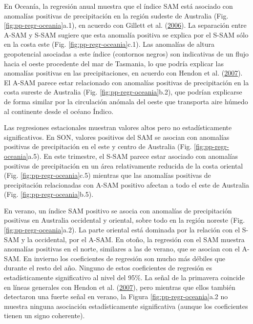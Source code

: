 \documentclass[12pt,oneside,a4paper]{reedthesis}
\begin{document}
En Oceanía, la regresión anual muestra que el índice SAM está asociado con anomalías positivas de precipitación en la región sudeste de Australia (Fig. \ref{fig:pp-regr-oceania}a.1), en acuerdo con Gillett et al. (\protect\hyperlink{ref-gillett2006}{2006}).
La separación entre A-SAM y S-SAM sugiere que esta anomalía positiva se explica por el S-SAM sólo en la costa este (Fig. \ref{fig:pp-regr-oceania}c.1).
Las anomalías de altura geopotencial asociadas a este índice (contornos negros) son indicativas de un flujo hacia el oeste procedente del mar de Tasmania, lo que podría explicar las anomalías positivas en las precipitaciones, en acuerdo con Hendon et al. (\protect\hyperlink{ref-hendon2007}{2007}).
El A-SAM parece estar relacionado con anomalías positivas de precipitación en la costa sureste de Australia (Fig. \ref{fig:pp-regr-oceania}b.2), que podrían explicarse de forma similar por la circulación anómala del oeste que transporta aire húmedo al continente desde el océano Índico.

Las regresiones estacionales muestran valores altos pero no estadísticamente significativos.
En SON, valores positivos del SAM se asocian con anomalías positivas de precipitación en el este y centro de Australia (Fig. \ref{fig:pp-regr-oceania}a.5).
En este trimestre, el S-SAM parece estar asociado con anomalías positivas de precipitación en un área relativamente reducida de la costa oriental (Fig. \ref{fig:pp-regr-oceania}c.5) mientras que las anomalías positivas de precipitación relacionadas con A-SAM positivo afectan a todo el este de Australia (Fig. \ref{fig:pp-regr-oceania}b.5).

En verano, un índice SAM positivo se asocia con anomalías de precipitación positivas en Australia occidental y oriental, sobre todo en la región noreste (Fig. \ref{fig:pp-regr-oceania}a.2).
La parte oriental está dominada por la relación con el S-SAM y la occidental, por el A-SAM.
En otoño, la regresión con el SAM muestra anomalías positivas en el norte, similares a las de verano, que se asocian con el A-SAM.
En invierno los coeficientes de regresión son mucho más débiles que durante el resto del año.
Ninguno de estos coeficientes de regresión es estadísticamente significativo al nivel del 95\%.
La señal de la primavera coincide en líneas generales con Hendon et al. (\protect\hyperlink{ref-hendon2007}{2007}), pero mientras que ellos también detectaron una fuerte señal en verano, la Figura \ref{fig:pp-regr-oceania}a.2 no muestra ninguna asociación estadísticamente significativa (aunque los coeficientes tienen un signo coherente).
\end{document}
